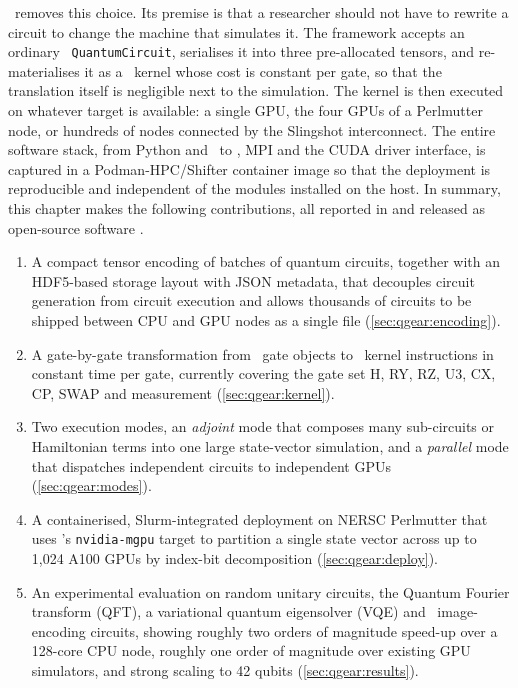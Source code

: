 \qgear\ removes this choice. Its premise is that a researcher should not have to rewrite a circuit to change the machine that simulates it. The framework accepts an ordinary \qiskit\ \texttt{QuantumCircuit}, serialises it into three pre-allocated tensors, and re-materialises it as a \cudaq\ kernel whose cost is constant per gate, so that the translation itself is negligible next to the simulation. The kernel is then executed on whatever target is available: a single GPU, the four GPUs of a Perlmutter node, or hundreds of nodes connected by the Slingshot interconnect. The entire software stack, from Python and \qiskit\ to \cudaq, MPI and the CUDA driver interface, is captured in a Podman-HPC/Shifter container image so that the deployment is reproducible and independent of the modules installed on the host. In summary, this chapter makes the following contributions, all reported in \cite{guo2025qgear} and released as open-source software \cite{guo2025qgearsoftware}.
\begin{enumerate}
  \item A compact tensor encoding of batches of quantum circuits, together with an HDF5-based storage layout with JSON metadata, that decouples circuit generation from circuit execution and allows thousands of circuits to be shipped between CPU and GPU nodes as a single file (\cref{sec:qgear:encoding}).
  \item A gate-by-gate transformation from \qiskit\ gate objects to \cudaq\ kernel instructions in constant time per gate, currently covering the gate set H, RY, RZ, U3, CX, CP, SWAP and measurement (\cref{sec:qgear:kernel}).
  \item Two execution modes, an \emph{adjoint} mode that composes many sub-circuits or Hamiltonian terms into one large state-vector simulation, and a \emph{parallel} mode that dispatches independent circuits to independent GPUs (\cref{sec:qgear:modes}).
  \item A containerised, Slurm-integrated deployment on NERSC Perlmutter that uses \cudaq's \texttt{nvidia-mgpu} target to partition a single state vector across up to 1,024 A100 GPUs by index-bit decomposition (\cref{sec:qgear:deploy}).
  \item An experimental evaluation on random unitary circuits, the Quantum Fourier transform (QFT), a variational quantum eigensolver (VQE) and \qcrank\ image-encoding circuits, showing roughly two orders of magnitude speed-up over a 128-core CPU node, roughly one order of magnitude over existing GPU simulators, and strong scaling to 42 qubits (\cref{sec:qgear:results}).
\end{enumerate}

